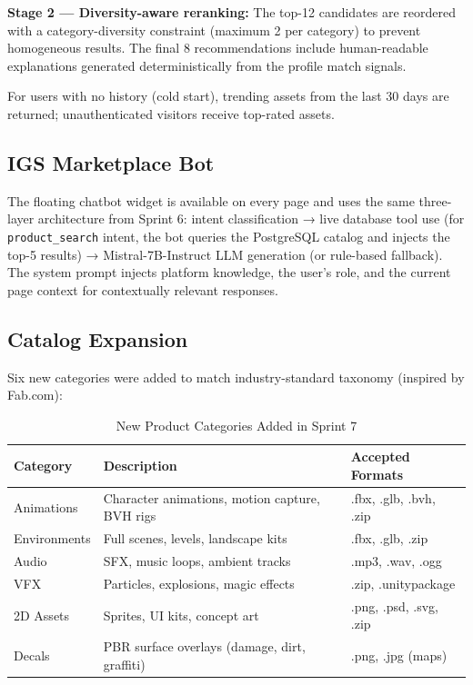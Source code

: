 \textbf{Stage 2 — Diversity-aware reranking:} The top-12 candidates are reordered with a category-diversity constraint (maximum 2 per category) to prevent homogeneous results. The final 8 recommendations include human-readable explanations generated deterministically from the profile match signals.

For users with no history (cold start), trending assets from the last 30 days are returned; unauthenticated visitors receive top-rated assets.

\subsection{IGS Marketplace Bot}

The floating chatbot widget is available on every page and uses the same three-layer architecture from Sprint 6: intent classification → live database tool use (for \texttt{product\_search} intent, the bot queries the PostgreSQL catalog and injects the top-5 results) → Mistral-7B-Instruct LLM generation (or rule-based fallback). The system prompt injects platform knowledge, the user's role, and the current page context for contextually relevant responses.

\subsection{Catalog Expansion}

Six new categories were added to match industry-standard taxonomy (inspired by Fab.com):

\begin{table}[H]
\centering
\caption{New Product Categories Added in Sprint 7}
\begin{tabularx}{\textwidth}{L{3cm} X L{4cm}}
\toprule
\textbf{Category} & \textbf{Description} & \textbf{Accepted Formats} \\
\midrule
Animations   & Character animations, motion capture, BVH rigs & .fbx, .glb, .bvh, .zip \\
Environments & Full scenes, levels, landscape kits            & .fbx, .glb, .zip \\
Audio        & SFX, music loops, ambient tracks               & .mp3, .wav, .ogg \\
VFX          & Particles, explosions, magic effects           & .zip, .unitypackage \\
2D Assets    & Sprites, UI kits, concept art                  & .png, .psd, .svg, .zip \\
Decals       & PBR surface overlays (damage, dirt, graffiti)  & .png, .jpg (maps) \\
\bottomrule
\end{tabularx}
\end{table}

